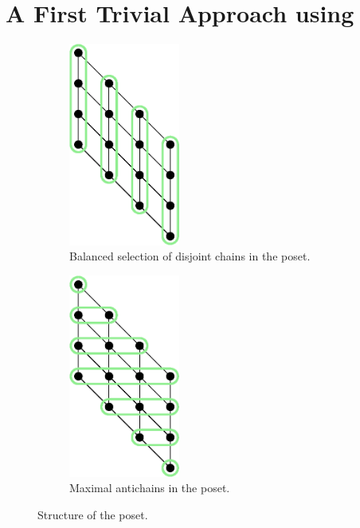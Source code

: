 \section{A First Trivial Approach using \mergesort}
\label{tree:xy:merge}

\begin{figure}
\centering
\begin{subfigure}[b]{0.40\textwidth}
\centering
	\includegraphics[width=0.4\textwidth]{fig/x+y/poset/chains}
	\caption{Balanced selection of disjoint chains in the \XY poset.}
	\label{fig:xy:poset:chains}
\end{subfigure}
\begin{subfigure}[b]{0.40\textwidth}
\centering
	\includegraphics[width=0.4\textwidth]{fig/x+y/poset/antichains}
	\caption{Maximal antichains in the \XY poset.}
	\label{fig:xy:poset:antichains}
\end{subfigure}
\caption{Structure of the \XY poset.}
\label{fig:xy:poset:diagrams}
\end{figure}


